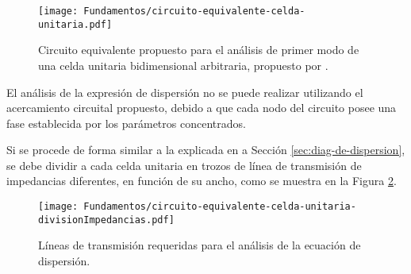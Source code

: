 \begin{figure}[h]
	\centering
	\texttt{[image: Fundamentos/circuito-equivalente-celda-unitaria.pdf]}
	\caption{Circuito equivalente propuesto para el análisis de primer modo de una celda unitaria bidimensional arbitraria, propuesto por \cite{KimSchuttAine:AnalysisHybrid}.}
	\label{fig:circuito-equivalente-kim-parches}
\end{figure}



El análisis de la expresión de dispersión no se puede realizar utilizando el acercamiento circuital propuesto, debido a que cada nodo del circuito posee una fase establecida por los parámetros concentrados.

Si se procede de forma similar a la explicada en a Sección \ref{sec:diag-de-dispersion}, se debe dividir a cada celda unitaria en trozos de línea de transmisión de impedancias diferentes, en función de su ancho, como se muestra en la Figura \ref{fig:division_en_trozos_impedancia}.


\begin{figure}[h]
	\centering
	\texttt{[image: Fundamentos/circuito-equivalente-celda-unitaria-divisionImpedancias.pdf]}
	\caption{Líneas de transmisión requeridas para el análisis de la ecuación de dispersión.}
	\label{fig:division_en_trozos_impedancia}
\end{figure}


